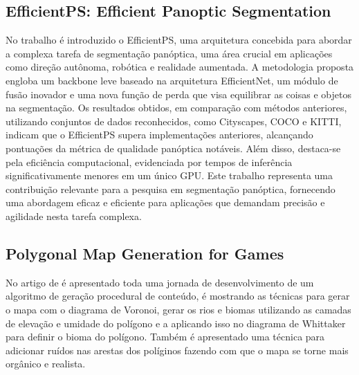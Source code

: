  \subsection*{EfficientPS: Efficient Panoptic Segmentation}
 No trabalho  é introduzido o EfficientPS, uma arquitetura concebida para abordar a complexa tarefa de segmentação panóptica, uma área crucial em aplicações como direção autônoma, robótica e realidade aumentada. A metodologia proposta engloba um backbone leve baseado na arquitetura EfficientNet, um módulo de fusão inovador e uma nova função de perda que visa equilibrar as coisas e objetos na segmentação. Os resultados obtidos, em comparação com métodos anteriores, utilizando conjuntos de dados reconhecidos, como Cityscapes, COCO e KITTI, indicam que o EfficientPS supera implementações anteriores, alcançando pontuações da métrica de qualidade panóptica notáveis. Além disso, destaca-se pela eficiência computacional, evidenciada por tempos de inferência significativamente menores em um único GPU. Este trabalho representa uma contribuição relevante para a pesquisa em segmentação panóptica, fornecendo uma abordagem eficaz e eficiente para aplicações que demandam precisão e agilidade nesta tarefa complexa.

 \subsection*{Polygonal Map Generation for Games}

 No artigo de  é apresentado toda uma jornada de desenvolvimento de um algoritmo de geração procedural de conteúdo, é mostrando as técnicas para gerar o mapa com o diagrama de Voronoi, gerar os rios e biomas utilizando as camadas de elevação e umidade do polígono e a aplicando isso no diagrama de Whittaker para definir o bioma do polígono. Também é apresentado uma técnica para adicionar ruídos nas arestas dos políginos fazendo com que o mapa se torne mais orgânico e realista.
